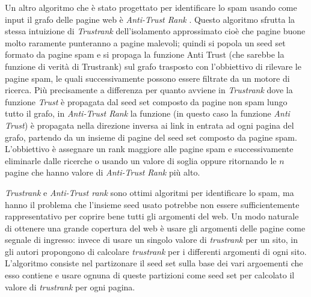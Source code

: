 Un altro algoritmo che è stato progettato per identificare lo spam usando come input il grafo delle pagine web è \textit{Anti-Trust Rank} \cite{Krishnan06webspam}. Questo algoritmo sfrutta la stessa intuizione di \textit{Trustrank} dell'isolamento approssimato cioè che pagine buone molto raramente punteranno a pagine malevoli;  quindi si popola un seed set formato da pagine spam e si propaga la funzione Anti Trust (che sarebbe la funzione di verità di Trustrank) sul grafo trasposto con l’obbiettivo di rilevare le pagine spam, le quali successivamente possono essere filtrate da un motore di ricerca. Più precisamente a differenza per quanto avviene in \textit{Trustrank} dove la funzione \textit{Trust} è propagata dal seed set composto da pagine non spam lungo tutto il grafo, in \textit{Anti-Trust Rank} la funzione (in questo caso la funzione \textit{Anti Trust}) è propagata nella direzione inversa ai link in entrata ad ogni pagina del grafo, partendo da un insieme di pagine del seed set composto da pagine spam.
 L'obbiettivo è assegnare un rank maggiore alle pagine spam e successivamente eliminarle dalle ricerche o usando un valore di soglia oppure ritornando le \(n\) pagine che hanno valore di \textit{Anti-Trust Rank} più alto.
 
\textit{Trustrank} e \textit{Anti-Trust rank} sono ottimi algoritmi per identificare lo spam, ma hanno il problema che l’insieme seed usato potrebbe non essere sufficientemente rappresentativo per coprire bene tutti gli argomenti del web. Un modo naturale di ottenere una grande copertura del web è usare gli argomenti delle pagine come segnale di ingresso: invece di usare un singolo valore di \textit{trustrank} per un sito, in \cite{Wu:2006:TTU:1135777.1135792} gli autori propongono di calcolare \textit{trustrank} per i differenti argomenti di ogni sito. L'algoritmo consiste nel partizonare il seed set sulla base dei vari argoementi che esso contiene e usare ognuna di queste partizioni come seed set per calcolato il valore di \textit{trustrank} per ogni pagina.

